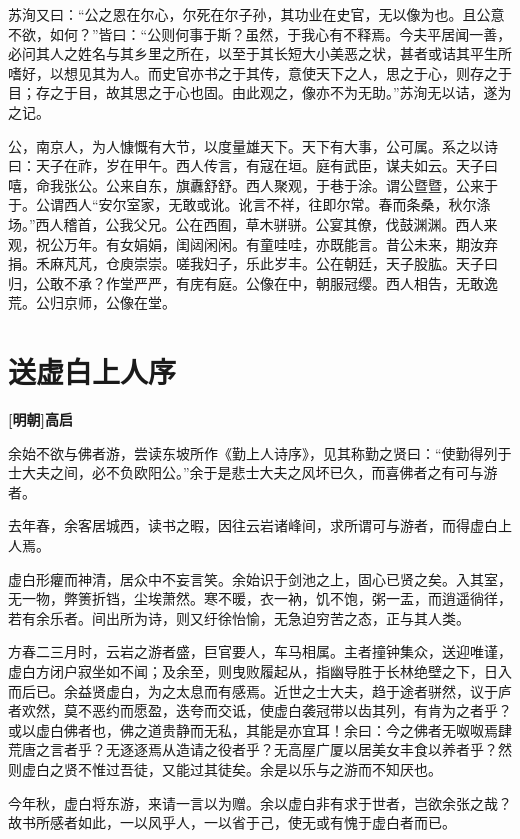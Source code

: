 \documentclass[UTF8,titlepage,oneside]{ctexbook}
\begin{document}
苏洵又曰：“公之恩在尔心，尔死在尔子孙，其功业在史官，无以像为也。且公意不欲，如何？”皆曰：“公则何事于斯？虽然，于我心有不释焉。今夫平居闻一善，必问其人之姓名与其乡里之所在，以至于其长短大小美恶之状，甚者或诘其平生所嗜好，以想见其为人。而史官亦书之于其传，意使天下之人，思之于心，则存之于目；存之于目，故其思之于心也固。由此观之，像亦不为无助。”苏洵无以诘，遂为之记。


公，南京人，为人慷慨有大节，以度量雄天下。天下有大事，公可属。系之以诗曰：天子在祚，岁在甲午。西人传言，有寇在垣。庭有武臣，谋夫如云。天子曰嘻，命我张公。公来自东，旗纛舒舒。西人聚观，于巷于涂。谓公暨暨，公来于于。公谓西人“安尔室家，无敢或讹。讹言不祥，往即尔常。春而条桑，秋尔涤场。”西人稽首，公我父兄。公在西囿，草木骈骈。公宴其僚，伐鼓渊渊。西人来观，祝公万年。有女娟娟，闺闼闲闲。有童哇哇，亦既能言。昔公未来，期汝弃捐。禾麻芃芃，仓庾崇崇。嗟我妇子，乐此岁丰。公在朝廷，天子股肱。天子曰归，公敢不承？作堂严严，有庑有庭。公像在中，朝服冠缨。西人相告，无敢逸荒。公归京师，公像在堂。



\chapter*{送虚白上人序}
\begin{center}
	\textbf{[明朝]高启}
\end{center}


余始不欲与佛者游，尝读东坡所作《勤上人诗序》，见其称勤之贤曰：“使勤得列于士大夫之间，必不负欧阳公。”余于是悲士大夫之风坏已久，而喜佛者之有可与游者。


去年春，余客居城西，读书之暇，因往云岩诸峰间，求所谓可与游者，而得虚白上人焉。


虚白形癯而神清，居众中不妄言笑。余始识于剑池之上，固心已贤之矣。入其室，无一物，弊箦折铛，尘埃萧然。寒不暖，衣一衲，饥不饱，粥一盂，而逍遥徜徉，若有余乐者。间出所为诗，则又纡徐怡愉，无急迫穷苦之态，正与其人类。


方春二三月时，云岩之游者盛，巨官要人，车马相属。主者撞钟集众，送迎唯谨，虚白方闭户寂坐如不闻；及余至，则曳败履起从，指幽导胜于长林绝壁之下，日入而后已。余益贤虚白，为之太息而有感焉。近世之士大夫，趋于途者骈然，议于庐者欢然，莫不恶约而愿盈，迭夸而交诋，使虚白袭冠带以齿其列，有肯为之者乎？或以虚白佛者也，佛之道贵静而无私，其能是亦宜耳！余曰：今之佛者无呶呶焉肆荒唐之言者乎？无逐逐焉从造请之役者乎？无高屋广厦以居美女丰食以养者乎？然则虚白之贤不惟过吾徒，又能过其徒矣。余是以乐与之游而不知厌也。


今年秋，虚白将东游，来请一言以为赠。余以虚白非有求于世者，岂欲余张之哉？故书所感者如此，一以风乎人，一以省于己，使无或有愧于虚白者而已。
\end{document}
